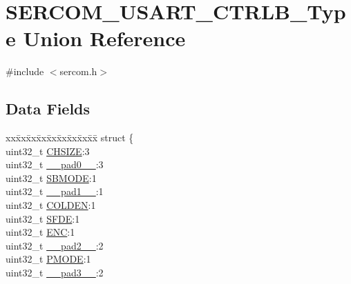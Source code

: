 \hypertarget{union_s_e_r_c_o_m___u_s_a_r_t___c_t_r_l_b___type}{}\section{S\+E\+R\+C\+O\+M\+\_\+\+U\+S\+A\+R\+T\+\_\+\+C\+T\+R\+L\+B\+\_\+\+Type Union Reference}
\label{union_s_e_r_c_o_m___u_s_a_r_t___c_t_r_l_b___type}


{\ttfamily \#include $<$sercom.\+h$>$}

\subsection*{Data Fields}
\begin{DoxyCompactItemize}
\item 
\begin{tabbing}
xx\=xx\=xx\=xx\=xx\=xx\=xx\=xx\=xx\=\kill
struct \{\\
\>uint32\_t \mbox{\hyperlink{union_s_e_r_c_o_m___u_s_a_r_t___c_t_r_l_b___type_a3c8e201cb02258c25ae7f86c3e0278a9}{CHSIZE}}:3\\
\>uint32\_t \mbox{\hyperlink{union_s_e_r_c_o_m___u_s_a_r_t___c_t_r_l_b___type_a3e57c2ef1c3ffb36722f000cc1156824}{\_\_pad0\_\_}}:3\\
\>uint32\_t \mbox{\hyperlink{union_s_e_r_c_o_m___u_s_a_r_t___c_t_r_l_b___type_ab86a9b6a01c46b5c61087ddf51bee4b2}{SBMODE}}:1\\
\>uint32\_t \mbox{\hyperlink{union_s_e_r_c_o_m___u_s_a_r_t___c_t_r_l_b___type_a6712ba6dd1d5b43d2d56ff8ac4e275a7}{\_\_pad1\_\_}}:1\\
\>uint32\_t \mbox{\hyperlink{union_s_e_r_c_o_m___u_s_a_r_t___c_t_r_l_b___type_a832586c15ca5c1d640cfd213d4a95001}{COLDEN}}:1\\
\>uint32\_t \mbox{\hyperlink{union_s_e_r_c_o_m___u_s_a_r_t___c_t_r_l_b___type_a5b4338c4b379b82c0e810afc3775b535}{SFDE}}:1\\
\>uint32\_t \mbox{\hyperlink{union_s_e_r_c_o_m___u_s_a_r_t___c_t_r_l_b___type_a03e909c88875bec671a9b37c6e022976}{ENC}}:1\\
\>uint32\_t \mbox{\hyperlink{union_s_e_r_c_o_m___u_s_a_r_t___c_t_r_l_b___type_a9ce12a63de64ef64ae2d59d128251cae}{\_\_pad2\_\_}}:2\\
\>uint32\_t \mbox{\hyperlink{union_s_e_r_c_o_m___u_s_a_r_t___c_t_r_l_b___type_a8108ba22fd83ae3a676c2f5943e6175d}{PMODE}}:1\\
\>uint32\_t \mbox{\hyperlink{union_s_e_r_c_o_m___u_s_a_r_t___c_t_r_l_b___type_a4854608c0e776f0704a4d9a4b98ea57d}{\_\_pad3\_\_}}:2\\

\end{tabbing}
\end{DoxyCompactItemize}

